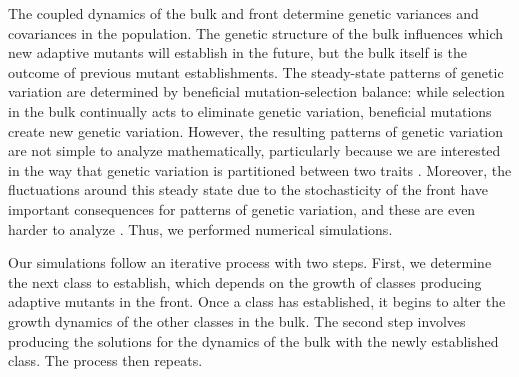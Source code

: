 \documentclass[9pt,twocolumn,twoside]{gsajnl}
\begin{document}
The coupled dynamics of the bulk and front determine genetic variances and covariances in the population. The genetic structure of the bulk influences which new adaptive mutants will establish in the future, but  the bulk itself is the outcome of previous mutant establishments. The steady-state patterns of genetic variation are determined by beneficial mutation-selection balance: while selection in the bulk continually acts to eliminate genetic variation, beneficial mutations create new genetic variation. However, the resulting patterns of genetic variation are not simple to analyze mathematically, particularly because we are interested in the way that genetic variation is  partitioned between two traits \citep{pearce2017rapid,Desai2013}. Moreover, the fluctuations around this steady state due to the stochasticity of the front have important consequences for patterns of genetic variation, and these are even harder to analyze \citep{hallatschek2011noisy,fisher2013asexual}. Thus, we performed numerical simulations.

Our simulations follow an iterative process with two steps. First, we determine the next class to establish, which depends on the growth of classes producing adaptive mutants in the front. Once a class has established, it begins to alter the growth dynamics of the other classes in the bulk. The second step involves producing the solutions for the dynamics of the bulk with the newly established class. The process then repeats. 
\end{document}
